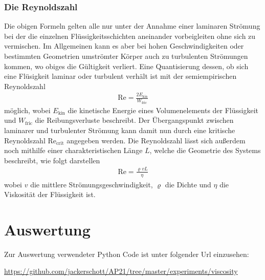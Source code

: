 \documentclass[12pt,a4paper,german]{scrartcl}
\numberwithin{equation}{section}
\begin{document}
  \subsubsection{Die Reynoldszahl}
  Die obigen Formeln gelten alle nur unter der Annahme einer laminaren Strömung bei der die einzelnen Flüssigkeitsschichten aneinander vorbeigleiten ohne sich zu vermischen. Im Allgemeinen kann es aber bei hohen Geschwindigkeiten oder bestimmten Geometrien umströmter Körper auch zu turbulenten Strömungen kommen, wo obiges die Gültigkeit verliert.
  Eine Quantisierung dessen, ob sich eine Flüsigkeit laminar oder turbulent verhält ist mit der semiempirischen Reynoldszahl
  \begin{align}
    \text{Re} = \frac{2 E_\text{kin}}{W_\text{fric}}
  \end{align}
  möglich, wobei $E_\text{kin}$ die kinetische Energie eines Volumenelements der Flüssigkeit und $W_\text{fric}$ die Reibungsverluste beschreibt.
  Der Übergangspunkt zwischen laminarer und turbulenter Strömung kann damit nun durch eine kritische Reynoldszahl $\text{Re}_\text{crit}$ angegeben werden.
  Die Reynoldszahl lässt sich außerdem noch mithilfe einer charakteristischen Länge $L$, welche die Geometrie des Systems beschreibt, wie folgt darstellen
  \begin{align}
    \text{Re} = \frac{\varrho v L}{\eta}
  \end{align}
  wobei $v$ die mittlere Strömungsgeschwindigkeit, $\varrho$ die Dichte und $\eta$ die Viskosität der Flüssigkeit ist.

  \newpage
  \section{Auswertung}
  Zur Auswertung verwendeter Python Code ist unter folgender Url einzusehen:
  \begin{center}
    \small
    \href{https://github.com/jackerschott/AP21/tree/master/experiments/viscosity}{https://github.com/jackerschott/AP21/tree/master/experiments/viscosity}
  \end{center}
\end{document}

